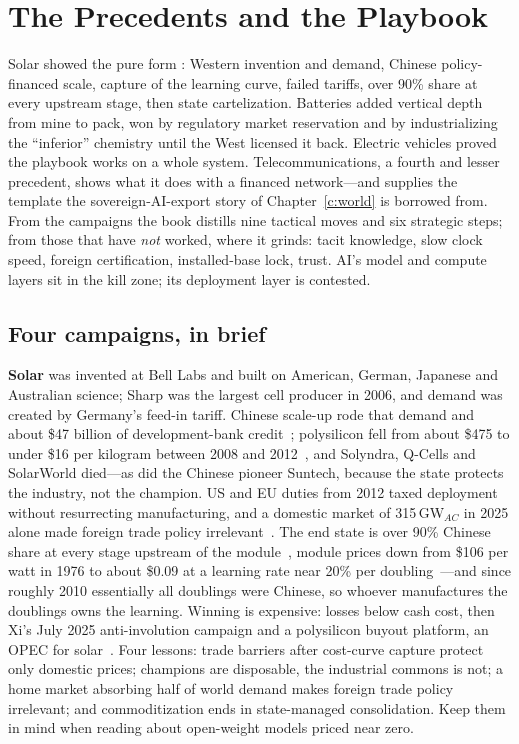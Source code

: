 \chapter{The Precedents and the Playbook}
\label{c:precedents}

\begin{glance}
Solar showed the pure form : Western invention and demand, Chinese policy-financed scale, capture of the learning curve, failed tariffs, over 90\% share at every upstream stage, then state cartelization. Batteries added vertical depth from mine to pack, won by regulatory market reservation and by industrializing the ``inferior'' chemistry until the West licensed it back. Electric vehicles proved the playbook works on a whole system. Telecommunications, a fourth and lesser precedent, shows what it does with a financed network---and supplies the template the sovereign-AI-export story of Chapter~\ref{c:world} is borrowed from. From the campaigns the book distills nine tactical moves and six strategic steps; from those that have \emph{not} worked, where it grinds: tacit knowledge, slow clock speed, foreign certification, installed-base lock, trust. AI's model and compute layers sit in the kill zone; its deployment layer is contested.
\end{glance}

\section{Four campaigns, in brief}

\textbf{Solar} was invented at Bell Labs and built on American, German, Japanese and Australian science; Sharp was the largest cell producer in 2006, and demand was created by Germany's feed-in tariff. Chinese scale-up rode that demand and about \$47 billion of development-bank credit~\cite{cdb-credit}; polysilicon fell from about \$475 to under \$16 per kilogram between 2008 and 2012~\cite{bernreuter}, and Solyndra, Q-Cells and SolarWorld died---as did the Chinese pioneer Suntech, because the state protects the industry, not the champion. US and EU duties from 2012 taxed deployment without resurrecting manufacturing, and a domestic market of 315\,GW$_{AC}$ in 2025 alone made foreign trade policy irrelevant~\cite{china-2025-installs}. The end state is over 90\% Chinese share at every stage upstream of the module~\cite{pv-shares-2023}, module prices down from \$106 per watt in 1976 to about \$0.09 at a learning rate near 20\% per doubling~\cite{owid-learning,energytrend-prices}---and since roughly 2010 essentially all doublings were Chinese, so whoever manufactures the doublings owns the learning. Winning is expensive: losses below cash cost, then Xi's July 2025 anti-involution campaign and a polysilicon buyout platform, an OPEC for solar~\cite{anti-involution,poly-platform}. Four lessons: trade barriers after cost-curve capture protect only domestic prices; champions are disposable, the industrial commons is not; a home market absorbing half of world demand makes foreign trade policy irrelevant; and commoditization ends in state-managed consolidation. Keep them in mind when reading about open-weight models priced near zero.

